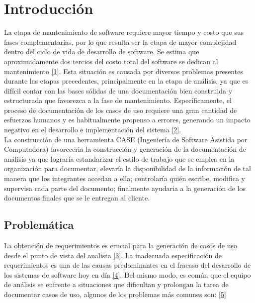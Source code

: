 

\chapter{Introducción}

La etapa de mantenimiento de software requiere mayor tiempo y costo que sus fases complementarias, por lo que resulta ser la etapa de mayor complejidad dentro del ciclo de vida de desarrollo de software. Se estima que aproximadamente dos tercios del costo total del software se dedican al mantenimiento \hyperlink{b01}{[1]}. Esta situación es causada por diversos problemas presentes durante las etapas precedentes, principalmente en la etapa de análisis, ya que es difícil contar con las bases sólidas de una documentación bien construida y estructurada que favorezca a la fase de  mantenimiento. Específicamente, el proceso de documentación de los casos de uso requiere una gran cantidad de esfuerzos humanos y es habitualmente propenso a errores, generando un impacto negativo en el desarrollo e implementación del sistema \hyperlink{b02}{[2]}. \\

La construcción de una herramienta  CASE (Ingeniería de Software Asistida por Computadora) favoreceria la construcción y generación de la documentación de análisis ya que lograría estandarizar el estilo de trabajo que se emplea en la organización para documentar, elevaría la disponibilidad de la información de tal manera que los integrantes accedan a ella; controlaría quién escribe, modifica y supervisa cada parte del documento; finalmente ayudaria a la generación de los documentos finales que se le entregan al cliente.

\newpage
\section{Problemática}

La obtención de requerimientos es crucial para la generación de casos de uso desde el punto de vista del analista \hyperlink{b03}{[3]}. La inadecuada especificación de requerimientos es una de las causas predominantes en el fracaso del desarrollo de los sistemas de software hoy en día \hyperlink{b04}{[4]}. Del mismo modo, es común que el equipo de análisis se enfrente a situaciones que dificultan y prolongan la tarea de documentar casos de uso, algunos de los problemas más comunes son: \hyperlink{b05}{[5]}

